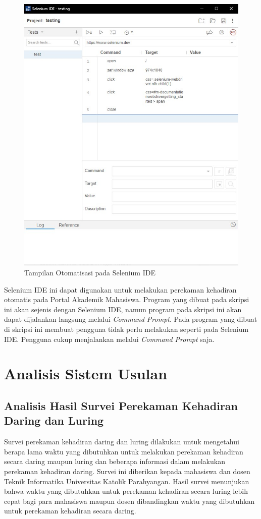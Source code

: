\begin{enumerate}
\begin{figure}[H]
		\includegraphics[scale=0.5]{Gambar/testing.jpg}
		\caption{Tampilan Otomatisasi pada Selenium IDE} 
		\label{fig:testing}
	\end{figure}	
\end{enumerate}

Selenium IDE ini dapat digunakan untuk melakukan perekaman kehadiran otomatis pada Portal Akademik Mahasiswa. Program yang dibuat pada skripsi ini akan sejenis dengan Selenium IDE, namun program pada skripsi ini akan dapat dijalankan langsung melalui \textit{Command Prompt}. Pada program yang dibuat di skripsi ini membuat pengguna tidak perlu melakukan seperti pada Selenium IDE. Pengguna cukup menjalankan melalui \textit{Command Prompt} saja.

\section{Analisis Sistem Usulan}

\subsection{Analisis Hasil Survei Perekaman Kehadiran Daring dan Luring}
\label{sec:survei} 
Survei perekaman kehadiran daring dan luring dilakukan untuk mengetahui berapa lama waktu yang dibutuhkan untuk melakukan perekaman kehadiran secara daring maupun luring dan beberapa informasi dalam melakukan perekaman kehadiran daring. Survei ini diberikan kepada mahasiswa dan dosen Teknik Informatika Universitas Katolik Parahyangan. Hasil survei menunjukan bahwa waktu yang dibutuhkan untuk perekaman kehadiran secara luring lebih cepat bagi para mahasiswa maupun dosen dibandingkan waktu yang dibutuhkan untuk perekaman kehadiran secara daring.


